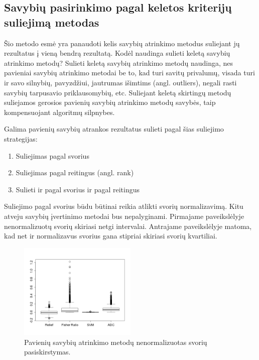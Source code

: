 \subsection{Savybių pasirinkimo pagal keletos kriterijų suliejimą metodas}

Šio metodo esmė yra panaudoti kelis savybių atrinkimo metodus suliejant jų
rezultatus į vieną bendrą rezultatą. Kodėl naudinga sulieti keletą savybių
atrinkimo metodų? Sulieti keletą savybių atrinkimo metodų naudinga, nes
pavieniai savybių atrinkimo metodai be to, kad turi savitų privalumų, visada
turi ir savo silnybių, pavyzdžiui, jautrumas išimtims (angl. outliers), negali
rasti savybių tarpusavio priklausomybių, etc. Suliejant keletą skirtingų metodų
suliejamos gerosios pavienių savybių atrinkimo metodų savybės, taip
kompensuojant algoritmų silpnybes.

Galima pavienių savybių atrankos rezultatus sulieti pagal šias suliejimo
strategijas:
\begin{enumerate}
  \item Suliejimas pagal svorius
  \item Suliejimas pagal reitingus (angl. rank)
  \item Sulieti ir pagal svorius ir pagal reitingus
\end{enumerate}

Suliejimo pagal svorius būdu būtinai reikia atlikti svorių normalizavimą. Kitu
atveju savybių įvertinimo metodai bus nepalyginami. Pirmajame paveikslėlyje
nenormalizuotų svorių skiriasi netgi intervalai. Antrajame paveikslėlyje matoma,
kad net ir normalizavus svorius gana stipriai skiriasi svorių kvartiliai.

\begin{figure}[htb]
\begin{center}
\leavevmode
\includegraphics[width=0.5\textwidth]{images/boxplot_colon_all.png}
\end{center}
\caption{Pavienių savybių atrinkimo metodų nenormalizuotas svorių
pasiskirstymas.}
\label{fig:flash}
\end{figure}

